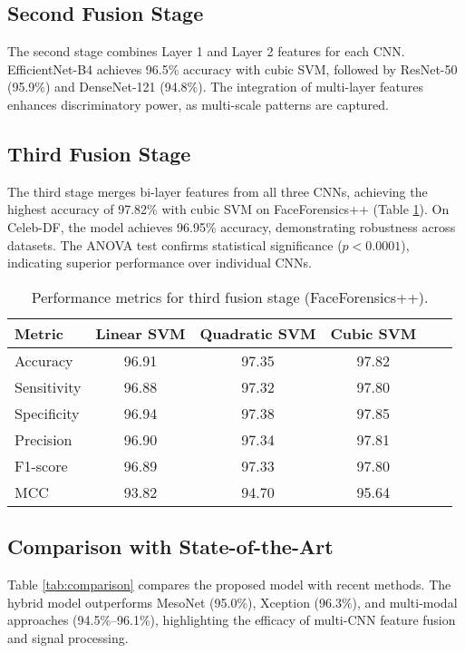 \documentclass[12pt]{article}
\begin{document}
\subsection{Second Fusion Stage}
The second stage combines Layer 1 and Layer 2 features for each CNN. EfficientNet-B4 achieves 96.5\% accuracy with cubic SVM, followed by ResNet-50 (95.9\%) and DenseNet-121 (94.8\%). The integration of multi-layer features enhances discriminatory power, as multi-scale patterns are captured.

\subsection{Third Fusion Stage}
The third stage merges bi-layer features from all three CNNs, achieving the highest accuracy of 97.82\% with cubic SVM on FaceForensics++ (Table \ref{tab:third_fusion}). On Celeb-DF, the model achieves 96.95\% accuracy, demonstrating robustness across datasets. The ANOVA test confirms statistical significance ($p < 0.0001$), indicating superior performance over individual CNNs.

\begin{table}[h]
    \centering
    \caption{Performance metrics for third fusion stage (FaceForensics++).}
    \label{tab:third_fusion}
    \begin{tabular}{lccccc}
        \toprule
        \textbf{Metric} & \textbf{Linear SVM} & \textbf{Quadratic SVM} & \textbf{Cubic SVM} \\
        \midrule
        Accuracy & 96.91 & 97.35 & 97.82 \\
        Sensitivity & 96.88 & 97.32 & 97.80 \\
        Specificity & 96.94 & 97.38 & 97.85 \\
        Precision & 96.90 & 97.34 & 97.81 \\
        F1-score & 96.89 & 97.33 & 97.80 \\
        MCC & 93.82 & 94.70 & 95.64 \\
        \bottomrule
    \end{tabular}
\end{table}

\subsection{Comparison with State-of-the-Art}
Table \ref{tab:comparison} compares the proposed model with recent methods. The hybrid model outperforms MesoNet (95.0\%), Xception (96.3\%), and multi-modal approaches (94.5\%–96.1\%), highlighting the efficacy of multi-CNN feature fusion and signal processing.
\end{document}

